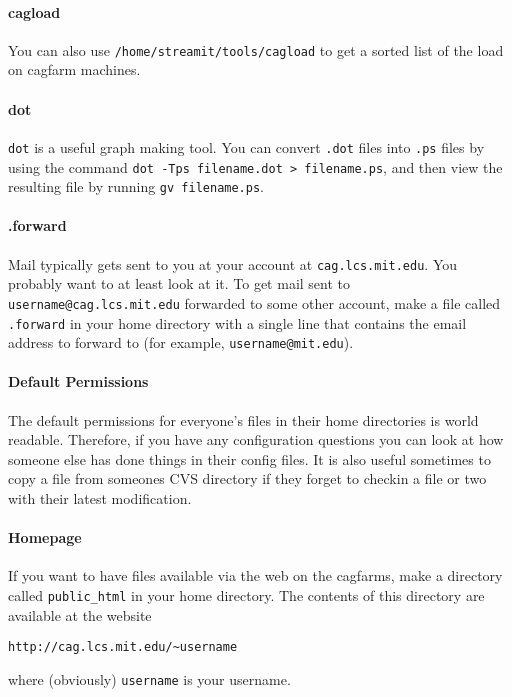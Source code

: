 \paragraph{cagload}

You can also use {\tt /home/streamit/tools/cagload} to get a sorted
list of the load on cagfarm machines.

\paragraph{dot}
\label{sec:dot}
{\tt dot} is a useful graph making tool. You can convert {\tt .dot}
files into {\tt .ps} files by using the command {\tt dot -Tps
  filename.dot > filename.ps}, and then view the resulting file by
running {\tt gv filename.ps}.

\paragraph{.forward}
Mail typically gets sent to you at your account at {\tt cag.lcs.mit.edu}. 
You probably want to
at least look at it. To get mail sent to {\tt username@cag.lcs.mit.edu}
forwarded to some other account, make a file called {\tt .forward}
in your home directory with a single line that contains the email address
to forward to (for example, {\tt username@mit.edu}).

\paragraph{Default Permissions}
The default permissions for everyone's files in their home directories
is world readable. Therefore, if you have any configuration questions 
you can look at how someone else has done things in their config files.
It is also useful sometimes to copy a file from someones
CVS directory if they forget to checkin a file or two with their
latest modification.

\paragraph{Homepage}
If you want to have files available via the web on the cagfarms, make
a directory called {\tt public\_html} in your home directory. The contents
of this directory are available at the website
\begin{verbatim}
http://cag.lcs.mit.edu/~username
\end{verbatim}
 where (obviously) {\tt username} is your username.

